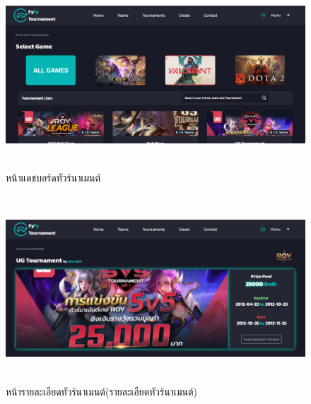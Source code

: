     \begin{figure}[ht]
      \begin{center}
      \includegraphics[width=18cm,height=7cm,keepaspectratio]{tournament.png}
      \end{center}
      \caption[หน้าแดชบอร์ดทัวร์นาเมนต์]{หน้าแดชบอร์ดทัวร์นาเมนต์}
      \label{fig:หน้าแดชบอร์ดทัวร์นาเมนต์}
    \end{figure}
    \begin{figure}[ht]
      \begin{center}
      \includegraphics[width=18cm,height=7cm,keepaspectratio]{tournament_each_detail.png}
      \end{center}
      \caption[หน้ารายละเอียดทัวร์นาเมนต์(รายละเอียดทัวร์นาเมนต์)]{หน้ารายละเอียดทัวร์นาเมนต์(รายละเอียดทัวร์นาเมนต์)}
      \label{fig:หน้ารายละเอียดทัวร์นาเมนต์(รายละเอียดทัวร์นาเมนต์)}
    \end{figure}
